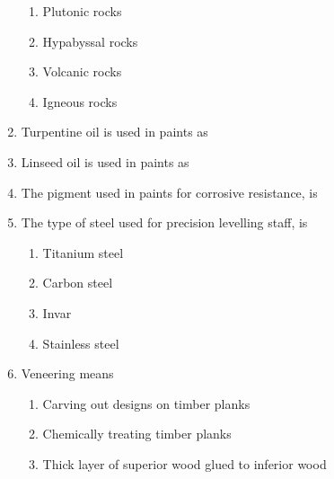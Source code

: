 \documentclass[11pt,a4paper]{article}
\begin{document}
\begin{enumerate}
\begin{enumerate}[label=\Alph*.]
\item{Plutonic rocks}
\item{Hypabyssal rocks}
\item{Volcanic rocks}
\item{Igneous rocks}
\end{enumerate}
\item{Turpentine oil is used in paints as}
\\
\item{Linseed oil is used in paints as}
\\
\item{The pigment used in paints for corrosive resistance, is}
\\
\item{The type of steel used for precision levelling staff, is}
\begin{enumerate}[label=\Alph*.]
\item{Titanium steel}
\item{Carbon steel}
\item{Invar}
\item{Stainless steel}
\end{enumerate}
\item{Veneering means}
\begin{enumerate}[label=\Alph*.]
\item{Carving out designs on timber planks}
\item{Chemically treating timber planks}
\item{Thick layer of superior wood glued to inferior wood}

\end{enumerate}
\end{enumerate}
\end{document}
